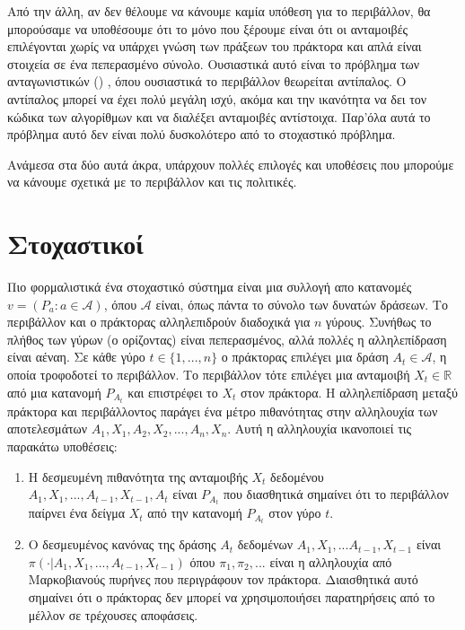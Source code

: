 Από την άλλη, αν δεν θέλουμε να κάνουμε καμία υπόθεση για το περιβάλλον, θα μπορούσαμε να υποθέσουμε ότι το μόνο που ξέρουμε είναι ότι οι ανταμοιβές επιλέγονται χωρίς να υπάρχει γνώση των πράξεων του πράκτορα και απλά είναι στοιχεία σε ένα πεπερασμένο σύνολο. Ουσιαστικά αυτό είναι το πρόβλημα των ανταγωνιστικών () , όπου ουσιαστικά το περιβάλλον θεωρείται αντίπαλος. Ο αντίπαλος μπορεί να έχει πολύ μεγάλη ισχύ, ακόμα και την ικανότητα να δει τον κώδικα των αλγορίθμων και να διαλέξει ανταμοιβές αντίστοιχα. Παρ'όλα αυτά το πρόβλημα αυτό δεν είναι πολύ δυσκολότερο από το στοχαστικό πρόβλημα.

Ανάμεσα στα δύο αυτά άκρα, υπάρχουν πολλές επιλογές και υποθέσεις που μπορούμε να κάνουμε σχετικά με το περιβάλλον και τις πολιτικές. 

\section{Στοχαστικοί }

Πιο φορμαλιστικά ένα στοχαστικό σύστημα  είναι μια συλλογή απο κατανομές $v = (P_a : a \in \mathcal{A})$, όπου $\mathcal{A}$ είναι, όπως πάντα το σύνολο των δυνατών δράσεων. Το περιβάλλον και ο πράκτορας αλληλεπιδρούν διαδοχικά για $n$ γύρους. Συνήθως το πλήθος των γύρων (ο ορίζοντας) είναι πεπερασμένος, αλλά πολλές η αλληλεπίδραση είναι αέναη. Σε κάθε γύρο $t \in \{1, ..., n\}$ ο πράκτορας επιλέγει μια δράση $A_t \in \mathcal{A}$, η οποία τροφοδοτεί το περιβάλλον. Το περιβάλλον τότε επιλέγει μια ανταμοιβή $X_t \in \mathbb{R}$ από μια κατανομή $P_{A_t}$ και επιστρέφει το $X_t$ στον πράκτορα. Η αλληλεπίδραση
μεταξύ πράκτορα και περιβάλλοντος παράγει ένα μέτρο πιθανότητας στην αλληλουχία των αποτελεσμάτων $A_1, X_1, A_2, X_2, ..., A_n, X_n$. Αυτή η αλληλουχία ικανοποιεί τις παρακάτω υποθέσεις:

\begin{enumerate}
    \item Η δεσμευμένη πιθανότητα της ανταμοιβής $X_t$ δεδομένου $A_1, X_1, ..., A_{t-1}, X_{t-1}, A_t$ είναι $P_{A_t}$ που διασθητικά σημαίνει ότι το περιβάλλον παίρνει ένα δείγμα $X_t$ από την κατανομή $P_{A_t}$ στον γύρο $t$.
    \item Ο δεσμευμένος κανόνας της δράσης $A_t$ δεδομένων $A_1, X_1, ... A_{t-1}, X_{t-1}$ είναι \\$π(\cdot|A_1,X_1,...,A_{t-1},X_{t-1})$ όπου $π_1, π_2, ...$ είναι η αλληλουχία από Μαρκοβιανούς πυρήνες που περιγράφουν τον πράκτορα. Διαισθητικά αυτό σημαίνει ότι ο πράκτορας δεν μπορεί να χρησιμοποιήσει παρατηρήσεις από το μέλλον σε τρέχουσες αποφάσεις.  
\end{enumerate}

